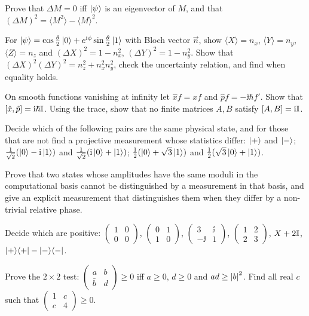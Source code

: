 \begin{exerciseset}
   Prove that $\Delta M=0$ iff $\left|\psi\right\rangle$ is an eigenvector of $M$, and that $(\Delta M)^2=\langle M^2\rangle-\langle M\rangle^2$.

   For $\left|\psi\right\rangle=\cos\frac\theta2\left|0\right\rangle+e^{\mathrm{i}\phi}\sin\frac\theta2\left|1\right\rangle$ with Bloch vector $\vec n$, show $\langle X\rangle=n_x$, $\langle Y\rangle=n_y$, $\langle Z\rangle=n_z$ and $(\Delta X)^2=1-n_x^2$, $(\Delta Y)^2=1-n_y^2$. Show that $(\Delta X)^2(\Delta Y)^2=n_z^2+n_x^2n_y^2$, check the uncertainty relation, and find when equality holds.

  \label{ex:no-xp} On smooth functions vanishing at infinity let $\hat xf=xf$ and $\hat pf=-\ii\hbar f'$. Show that $[\hat x,\hat p]=\mathrm{i}\hbar\mathbb{I}$. Using the trace, show that no finite matrices $A,B$ satisfy $[A,B]=\mathrm{i}\mathbb{I}$.

   Decide which of the following pairs are the same physical state, and for those that are not find a projective measurement whose statistics differ: $\left|+\right\rangle$ and $\left|-\right\rangle$; $\frac1{\sqrt2}(\left|0\right\rangle-\mathrm{i}\left|1\right\rangle)$ and $\frac1{\sqrt2}(\mathrm{i}\left|0\right\rangle+\left|1\right\rangle)$; $\tfrac12(\left|0\right\rangle+\sqrt3\left|1\right\rangle)$ and $\tfrac12(\sqrt3\left|0\right\rangle+\left|1\right\rangle)$.

   Prove that two states whose amplitudes have the same moduli in the computational basis cannot be distinguished by a measurement in that basis, and give an explicit measurement that distinguishes them when they differ by a non-trivial relative phase.

   Decide which are positive: $\begin{pmatrix}1&0\\0&0\end{pmatrix}$, $\begin{pmatrix}0&1\\1&0\end{pmatrix}$, $\begin{pmatrix}3&\ii\\-\ii&1\end{pmatrix}$, $\begin{pmatrix}1&2\\2&3\end{pmatrix}$, $X+2\mathbb{I}$, $\left|+\right\rangle\!\left\langle+\right|-\left|-\right\rangle\!\left\langle-\right|$.

   Prove the $2\times2$ test: $\begin{pmatrix}a&b\\\bar b&d\end{pmatrix}\ge0$ iff $a\ge0$, $d\ge0$ and $ad\ge\left|b\right|^2$. Find all real $c$ such that $\begin{pmatrix}1&c\\c&4\end{pmatrix}\ge0$.


\end{exerciseset}
